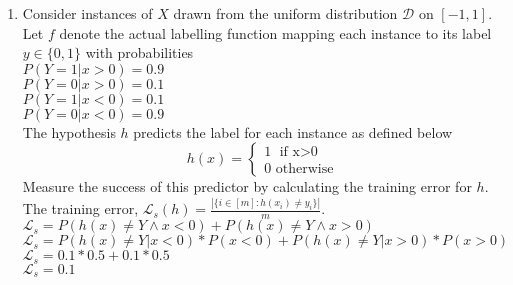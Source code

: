 \documentclass[12pt]{article}
\begin{document}
\begin{enumerate}
    \item Consider instances of $X$ drawn from the uniform distribution $\mathcal{D}$ on $[-1,1]$. Let $f$ denote the actual labelling function mapping each instance to its label $y\in \{0,1\}$ with probabilities\\
    $P(Y=1|x>0)=0.9$\\
    $P(Y=0|x>0)=0.1$\\
    $P(Y=1|x<0)=0.1$\\
    $P(Y=0|x<0)=0.9$\\
    The hypothesis $h$ predicts the label for each instance as defined below
    \[
    h(x)=\begin{cases}
    1 \text{ if x$>$0 }\\
    0 \text{ otherwise}
    \end{cases}
    \]
    Measure the success of this predictor by calculating the training error for $h$.\\
    The training error, $\mathcal{L}_s(h)=\frac{|\{i \in [m]: h(x_i)\neq y_i\}|}{m}$.\\
    $\mathcal{L}_s=P(h(x)\neq Y\land x<0)+P(h(x)\neq Y\land x>0)$\\
    $\mathcal{L}_s=P(h(x)\neq Y|x<0)*P(x<0)+P(h(x)\neq Y|x>0)*P(x>0)$\\
    $\mathcal{L}_s=0.1*0.5+0.1*0.5$\\
    $\mathcal{L}_s=0.1$
\end{enumerate}
\end{document}
